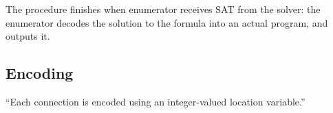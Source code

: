 The procedure finishes when enumerator receives SAT from the solver: the
enumerator decodes the solution to the formula into an actual program, and
outputs it.


\subsection{Encoding}
\label{sec:encoding}


``Each connection is encoded using an integer-valued location variable.''

